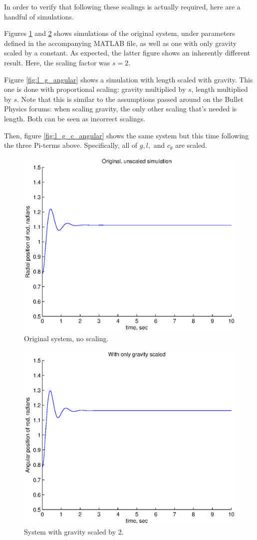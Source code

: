 \documentclass[12pt,letterpaper]{article}
\begin{document}
In order to verify that following these scalings is actually required, here are a handful of simulations.

Figures \ref{fig:original_angular} and \ref{fig:grav_only_angular} shows simulations of the original system, under parameters defined in the accompanying MATLAB file, as well as one with only gravity scaled by a constant.
As expected, the latter figure shows an inherently different result.
Here, the scaling factor was $s=2$.

Figure \ref{fig:l_g_angular} shows a simulation with length scaled with gravity.
This one is done with proportional scaling: gravity multiplied by $s$, length multiplied by $s$.
Note that this is similar to the assumptions passed around on the Bullet Physics forums: when scaling gravity, the only other scaling that's needed is length.
Both can be seen as incorrect scalings.

Then, figure \ref{fig:l_g_c_angular} shows the same system but this time following the three Pi-terms above.
Specifically, all of $g, l,$ and $c_{\theta}$ are scaled.

\begin{figure}[ht]
  \centering
  \includegraphics[width=.48\linewidth]{img/original_angular.eps}
  \caption{Original system, no scaling. }
  \label{fig:original_angular}
\end{figure}

\begin{figure}[ht]
  \centering
  \includegraphics[width=.48\linewidth]{img/grav_only_angular.eps}
  \caption{System with gravity scaled by 2. }
  \label{fig:grav_only_angular}
\end{figure}
\end{document}
